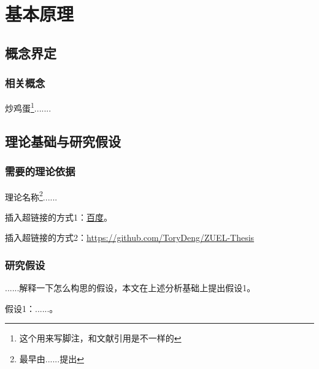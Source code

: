 \chapter{基本原理}
\section{概念界定}
\subsection{相关概念}
炒鸡蛋\footnote{这个用来写脚注，和文献引用是不一样的}.......

\section{理论基础与研究假设}
\subsection{需要的理论依据}
理论名称\footnote{最早由......提出}......

插入超链接的方式1：\href{http://www.baidu.com}{百度}。 \par
插入超链接的方式2：\url{https://github.com/ToryDeng/ZUEL-Thesis}

\subsection{研究假设}
......解释一下怎么构思的假设，本文在上述分析基础上提出假设1。

假设1：......。
